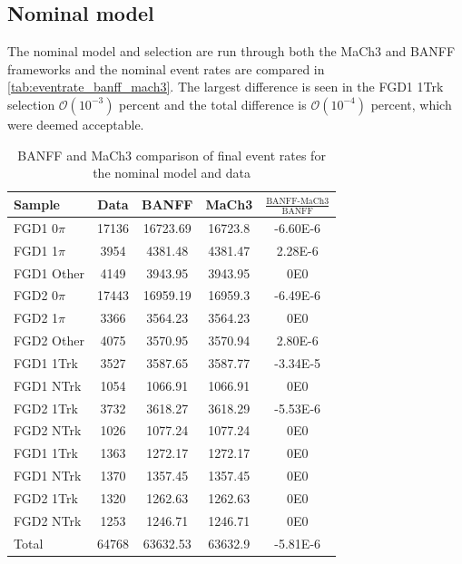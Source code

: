 \subsection{Nominal model}
The nominal model and selection are run through both the MaCh3 and BANFF frameworks and the nominal event rates are compared in \autoref{tab:eventrate_banff_mach3}. The largest difference is seen in the FGD1 1Trk selection $\mathcal{O}(10^{-3})$ percent and the total difference is $\mathcal{O}(10^{-4})$ percent, which were deemed acceptable.
\begin{table}[h]
	\centering
	\begin{tabular}{ l | c c c c }
		\hline 
		\hline 
		Sample & Data  & BANFF & MaCh3 & $\frac{\text{BANFF-MaCh3}}{\text{BANFF}}$ \\ 
		\hline
		FGD1 0$\pi$ &  17136 &  16723.69 & 16723.8 & -6.60E-6 \\
		FGD1 1$\pi$ &  3954 &  4381.48 & 4381.47 & 2.28E-6\\ 
		FGD1 Other &  4149 &  3943.95 & 3943.95 & 0E0\\ 
		\hline
		FGD2 0$\pi$ &  17443 &  16959.19 & 16959.3 & -6.49E-6 \\
		FGD2 1$\pi$ &  3366 &  3564.23 & 3564.23 & 0E0\\
		FGD2 Other &  4075 &  3570.95 & 3570.94 & 2.80E-6 \\
		\hline
		FGD1 1Trk &  3527 &  3587.65 & 3587.77 & -3.34E-5\\ 
		FGD1 NTrk &  1054 &  1066.91 & 1066.91 & 0E0\\
		\hline
		FGD2 1Trk &  3732 &  3618.27 & 3618.29 & -5.53E-6 \\
		FGD2 NTrk &  1026 &  1077.24 & 1077.24 & 0E0 \\
		\hline
		FGD1 \numu 1Trk &  1363 &  1272.17 & 1272.17 & 0E0\\
		FGD1 \numu NTrk &  1370 &  1357.45 & 1357.45 & 0E0 \\
		\hline
		FGD2 \numu 1Trk &  1320 &  1262.63 & 1262.63 & 0E0 \\
		FGD2 \numu NTrk &  1253 &  1246.71 & 1246.71 & 0E0 \\
		\hline
		Total &  64768 &  63632.53 & 63632.9 & -5.81E-6 \\
		\hline
		\hline
	\end{tabular}
	\caption{BANFF and MaCh3 comparison of final event rates for the nominal model and data}
	\label{tab:eventrate_banff_mach3}
\end{table}

